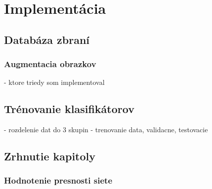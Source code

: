 
\chapter{Implementácia}



\section{Databáza zbraní}

\subsection{Augmentacia obrazkov}
- ktore triedy som implementoval


\section{Trénovanie klasifikátorov}
- rozdelenie dat do 3 skupin - trenovanie data, validacne, testovacie

\section{Zrhnutie kapitoly}

\begin{comment}

    \subsection{implementacia a vysledky- poznamky}
    \begin{enumerate}
        \item[$\bullet$] Z kade som realne cerpal data nakoniec
        \item[$\bullet$] Ako prebiehala augmentacia dat, opisat funkcie ktore sa pouzivaju pre dogenerovanie obrazkov a nazov tried ktore to implementuju.
        \item[$\bullet$] Obrazok trenovanie neuronovej siete
        \item[$\bullet$] Dosiahnute vysledky
        \item[$\bullet$] vytvorit velku prehladnu tabulku pre budu kompletne vysledky, tak ako to je na git-e opisane
    \end{enumerate}

\end{comment}

\subsection{Hodnotenie presnosti siete}

